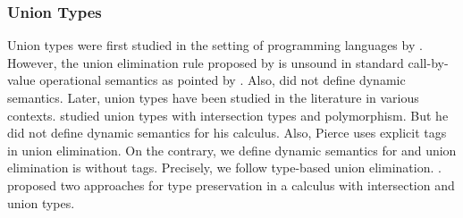 \subsubsection*{Union Types}
\begin{comment}
Set-theoretic unions have sound theory and extensively studied in
mathematics. Set-theoretic unions correspond to union types or
disjoint union types in programming languages. Disjoint union types
are also called sum types or variants.  Constructors are explicitly
labeled in disjoint union types and expressions are manipulated using
corresponding labels. Few other interesting calculi (and this paper)
do not use labels and provide type-based union elimination.
\end{comment}
Union types were first studied in the setting of programming languages
by \citet{macqueen1984ideal}. However, the union elimination rule
proposed by \citet{macqueen1984ideal} is unsound in standard call-by-value
operational semantics as pointed by \cite{dunfield2003type}.
Also, \citet{macqueen1984ideal} did not define dynamic semantics.
Later, union types have been studied
in the literature in various contexts. \citet{pierce1991programming}
studied union types with intersection types and polymorphism. But he
did not define dynamic semantics for his calculus. Also, Pierce
uses explicit tags in union elimination. On the contrary, we define
dynamic semantics for \cal and union elimination is without tags.
Precisely, we follow type-based union elimination.
.
\citet{barbanera1995intersection} proposed
two approaches for type preservation in a calculus with intersection and union
types.

